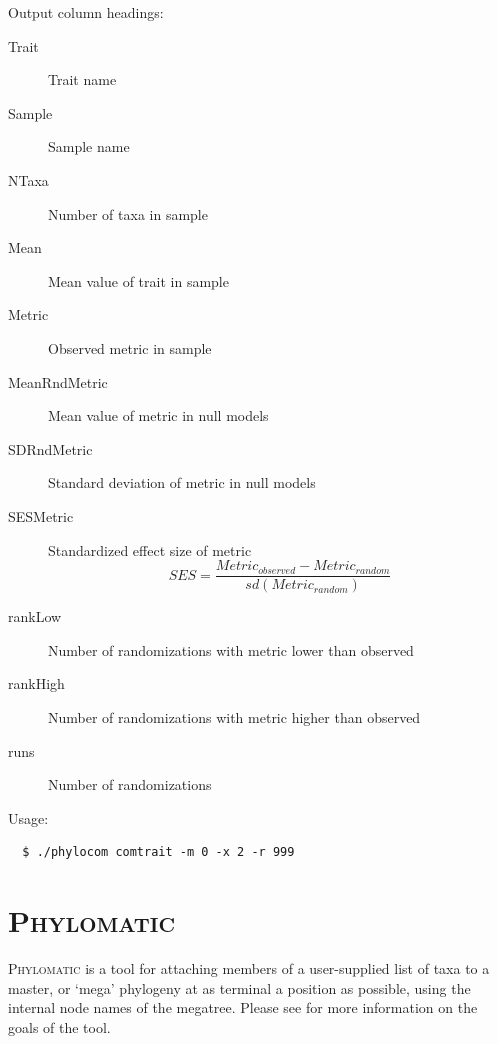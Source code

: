 \documentclass[12pt,letterpaper]{article}
\begin{document}
\noindent Output column headings:

\begin{description}
\item[\hspace{1em} Trait] Trait name
\item[\hspace{1em} Sample] Sample name
\item[\hspace{1em} NTaxa] Number of taxa in sample
\item[\hspace{1em} Mean] Mean value of trait in sample
\item[\hspace{1em} Metric] Observed metric in sample
\item[\hspace{1em} MeanRndMetric] Mean value of metric in null models
\item[\hspace{1em} SDRndMetric] Standard deviation of metric in null models
\item[\hspace{1em} SESMetric] Standardized effect size of metric
	\[SES = \frac{ Metric_{observed} - Metric_{random} }{sd(Metric_{random})}\]
\item[\hspace{1em} rankLow] Number of randomizations with metric lower
  than observed %
\item[\hspace{1em} rankHigh] Number of randomizations with metric
  higher than observed %
\item[\hspace{1em} runs] Number of randomizations
\end{description}

\noindent Usage:

\begin{verbatim}
  $ ./phylocom comtrait -m 0 -x 2 -r 999
\end{verbatim}

\section{\scshape Phylomatic}
 
{\scshape Phylomatic} is a tool for attaching members of a
user-supplied list of taxa to a master, or `mega' phylogeny at as
terminal a position as possible, using the internal node names of the
megatree.  Please see \citet{webb2005phy} for more information on the
goals of the tool.
\end{document}
